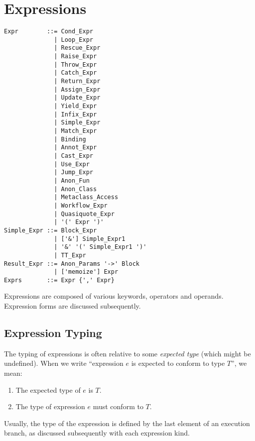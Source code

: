 
\chapter{Expressions}


\syntax\begin{lstlisting}
Expr        ::= Cond_Expr
              | Loop_Expr
              | Rescue_Expr
              | Raise_Expr
              | Throw_Expr
              | Catch_Expr
              | Return_Expr
              | Assign_Expr
              | Update_Expr
              | Yield_Expr
              | Infix_Expr
              | Simple_Expr
              | Match_Expr
              | Binding
              | Annot_Expr
              | Cast_Expr
              | Use_Expr
              | Jump_Expr
              | Anon_Fun
              | Anon_Class
              | Metaclass_Access
              | Workflow_Expr
              | Quasiquote_Expr
              | '(' Expr ')'
Simple_Expr ::= Block_Expr
              | ['&'] Simple_Expr1
              | '&' '(' Simple_Expr1 ')'
              | TT_Expr
Result_Expr ::= Anon_Params '->' Block 
              | ['memoize'] Expr
Exprs       ::= Expr {',' Expr}
\end{lstlisting}

Expressions are composed of various keywords, operators and operands. Expression forms are discussed subsequently. 







\section{Expression Typing}
\label{sec:expression-typing}

The typing of expressions is often relative to some {\em expected type} (which might be undefined). When we write ``expression $e$ is expected to conform to type $T$'', we mean:
\begin{enumerate}
\item The expected type of $e$ is $T$.
\item The type of expression $e$ must conform to $T$. 
\end{enumerate}

Usually, the type of the expression is defined by the last element of an execution branch, as discussed subsequently with each expression kind. 

